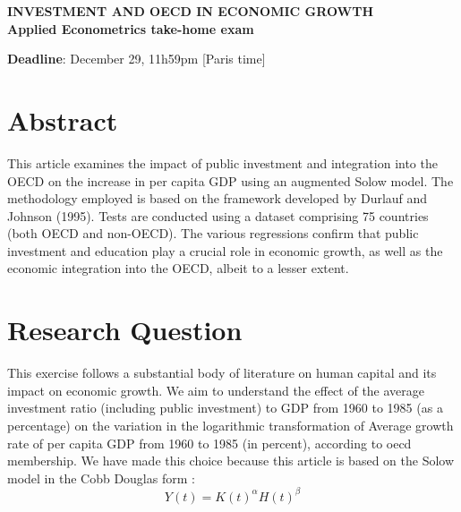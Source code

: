 \documentclass[12pt,fleqn]{report}
\begin{document}
\cfoot{}

\thispagestyle{fancy}

\hfill
\vspace{7cm}

\begin{center}

\LARGE{{\bf INVESTMENT AND OECD IN ECONOMIC GROWTH}} \\
\Large{{\bf Applied Econometrics  take-home exam}}\\

\vspace{5cm}

\vspace{8cm}

\Large{{\bf Deadline}: December 29, 11h59pm [Paris time]}\\

\end{center}

\hfill
\vspace{5cm}

\newpage
\setcounter{page}{1}

\section*{Abstract}

This article examines the impact of public investment and integration into the OECD on the increase in per capita GDP using an augmented Solow model. The methodology employed is based on the framework developed by Durlauf and Johnson (1995). Tests are conducted using a dataset comprising 75 countries (both OECD and non-OECD). The various regressions confirm that public investment and education play a crucial role in economic growth, as well as the economic integration into the OECD, albeit to a lesser extent.

\section*{Research Question}
This exercise follows a substantial body of literature on human capital and its impact on economic growth. We aim to understand the effect of the average investment ratio (including public investment) to GDP from 1960 to 1985 (as a percentage) on the variation in the logarithmic transformation of Average growth rate of per capita GDP from 1960 to 1985 (in percent), according to oecd membership. We have made this choice because this article is based on the Solow model in the Cobb Douglas form : \[Y(t) = K(t)^{\alpha} H(t)^{\beta}\]
\end{document}
